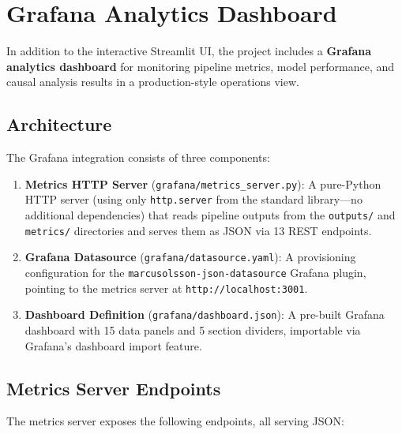 \documentclass[12pt,a4paper]{article}
\begin{document}
\section{Grafana Analytics Dashboard}
\label{sec:grafana}

In addition to the interactive Streamlit UI, the project includes a \textbf{Grafana analytics dashboard} for monitoring pipeline metrics, model performance, and causal analysis results in a production-style operations view.

\subsection{Architecture}

The Grafana integration consists of three components:

\begin{enumerate}[nosep]
  \item \textbf{Metrics HTTP Server} (\texttt{grafana/metrics\_server.py}): A pure-Python HTTP server (using only \texttt{http.server} from the standard library---no additional dependencies) that reads pipeline outputs from the \texttt{outputs/} and \texttt{metrics/} directories and serves them as JSON via 13 REST endpoints.

  \item \textbf{Grafana Datasource} (\texttt{grafana/datasource.yaml}): A provisioning configuration for the \texttt{marcusolsson-json-datasource} Grafana plugin, pointing to the metrics server at \texttt{http://localhost:3001}.

  \item \textbf{Dashboard Definition} (\texttt{grafana/dashboard.json}): A pre-built Grafana dashboard with 15 data panels and 5 section dividers, importable via Grafana's dashboard import feature.
\end{enumerate}

\subsection{Metrics Server Endpoints}

The metrics server exposes the following endpoints, all serving JSON:
\end{document}

